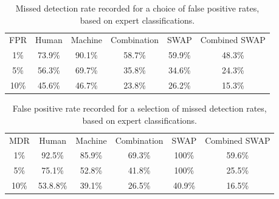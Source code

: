\documentclass[a4paper,fleqn,usenatbib]{mnras}
\begin{document}
\begin{table}
\begin{minipage}{120mm}
\centering
\begin{tabular}{|c|c|c|c|c|c|}
FPR & Human & Machine & Combination & SWAP & Combined SWAP\\
1\% & 73.9\% & 90.1\% & 58.7\% & 59.9\% & 48.3\% \\
5\% & 56.3\% & 69.7\% & 35.8\% & 34.6\% & 24.3\%\\
10\% & 45.6\% & 46.7\% & 23.8\% & 26.2\% & 15.3\%\\
\end{tabular}
\caption{Missed detection rate recorded for a choice of false positive rates, based on expert classifications.}
\label{tab:roc_fpr}
\end{minipage}
\end{table}



\begin{table}
\begin{minipage}{120mm}
\centering
\begin{tabular}{|c|c|c|c|c|c|}
MDR & Human & Machine & Combination & SWAP & Combined SWAP\\
1\% & 92.5\% & 85.9\% & 69.3\% & 100\% & 59.6\%\\
5\% & 75.1\% & 52.8\% & 41.8\% & 100\% & 25.5\%\\
10\% & 53.8.8\% & 39.1\% & 26.5\% & 40.9\% & 16.5\%\\
\end{tabular}
\caption{False positive rate recorded for a selection of missed detection rates, based on expert classifications.
}\label{tab:roc_mdr}
\end{minipage}
\end{table}
\end{document}
